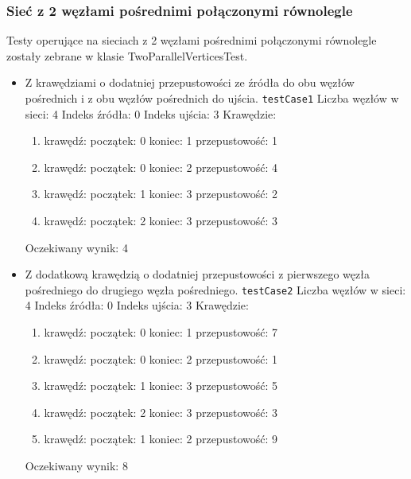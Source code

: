 \subsubsection{Sieć z 2 węzłami pośrednimi połączonymi równolegle}
Testy operujące na sieciach z 2 węzłami pośrednimi połączonymi równolegle zostały
zebrane w klasie TwoParallelVerticesTest.
\begin{itemize}[nosep]
    \item Z krawędziami o dodatniej przepustowości ze źródła do obu węzłów
    pośrednich i z obu węzłów pośrednich do ujścia.
    \texttt{testCase1}
    Liczba węzłów w sieci: 4
    Indeks źródła: 0
    Indeks ujścia: 3
    Krawędzie:
    \begin{enumerate}[nosep]
        \item krawędź:
        początek: 0
        koniec: 1
        przepustowość: 1
        \item krawędź:
        początek: 0
        koniec: 2
        przepustowość: 4
        \item krawędź:
        początek: 1
        koniec: 3
        przepustowość: 2
        \item krawędź:
        początek: 2
        koniec: 3
        przepustowość: 3
    \end{enumerate}
    Oczekiwany wynik: 4

    \item Z dodatkową krawędzią o dodatniej przepustowości z pierwszego węzła
    pośredniego do drugiego węzła pośredniego.
    \texttt{testCase2}
    Liczba węzłów w sieci: 4
    Indeks źródła: 0
    Indeks ujścia: 3
    Krawędzie:
    \begin{enumerate}[nosep]
        \item krawędź:
        początek: 0
        koniec: 1
        przepustowość: 7
        \item krawędź:
        początek: 0
        koniec: 2
        przepustowość: 1
        \item krawędź:
        początek: 1
        koniec: 3
        przepustowość: 5
        \item krawędź:
        początek: 2
        koniec: 3
        przepustowość: 3
        \item krawędź:
        początek: 1
        koniec: 2
        przepustowość: 9
    \end{enumerate}
    Oczekiwany wynik: 8


\end{itemize}
